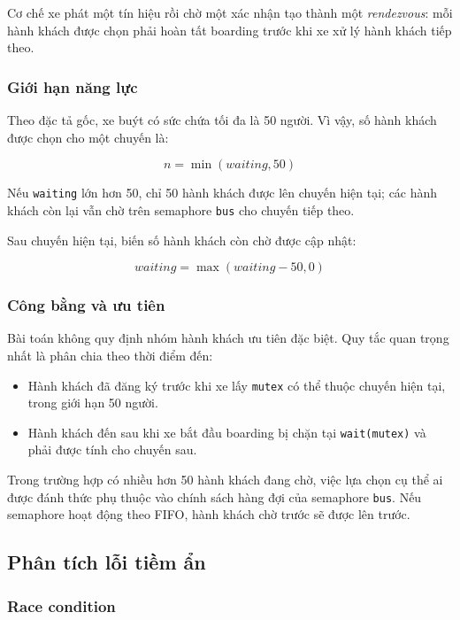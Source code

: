 Cơ chế xe phát một tín hiệu rồi chờ một xác nhận tạo thành một
\textit{rendezvous}: mỗi hành khách được chọn phải hoàn tất boarding
trước khi xe xử lý hành khách tiếp theo.

\subsubsection*{Giới hạn năng lực}

Theo đặc tả gốc, xe buýt có sức chứa tối đa là 50 người. Vì vậy, số
hành khách được chọn cho một chuyến là:

\[
n = \min(waiting, 50)
\]

Nếu \texttt{waiting} lớn hơn 50, chỉ 50 hành khách được lên chuyến hiện
tại; các hành khách còn lại vẫn chờ trên semaphore \texttt{bus} cho
chuyến tiếp theo.

Sau chuyến hiện tại, biến số hành khách còn chờ được cập nhật:

\[
waiting = \max(waiting - 50, 0)
\]
\cite[Sec.~7.4, p.~211; Sec.~7.4.3, p.~217]{downey2016}

\subsubsection*{Công bằng và ưu tiên}

Bài toán không quy định nhóm hành khách ưu tiên đặc biệt. Quy tắc quan
trọng nhất là phân chia theo thời điểm đến:

\begin{itemize}
\item Hành khách đã đăng ký trước khi xe lấy \texttt{mutex} có thể
thuộc chuyến hiện tại, trong giới hạn 50 người.
\item Hành khách đến sau khi xe bắt đầu boarding bị chặn tại
\texttt{wait(mutex)} và phải được tính cho chuyến sau.
\end{itemize}

Trong trường hợp có nhiều hơn 50 hành khách đang chờ, việc lựa chọn cụ
thể ai được đánh thức phụ thuộc vào chính sách hàng đợi của semaphore
\texttt{bus}. Nếu semaphore hoạt động theo FIFO, hành khách chờ trước
sẽ được lên trước.


\subsection{Phân tích lỗi tiềm ẩn}

\subsubsection*{Race condition}

